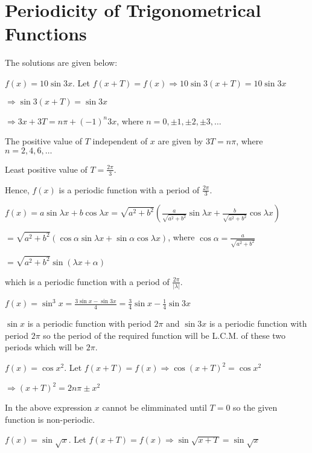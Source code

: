 \chapter{Periodicity of Trigonometrical Functions}
\startitemize[n, 1*broad]
\item The solutions are given below:
  \startitemize[i]
   \item $f(x) = 10\sin3x$. Let $f(x + T) = f(x) \Rightarrow 10\sin3(x + T) = 10\sin3x$

     $\Rightarrow \sin3(x + T) = \sin3x$

     $\Rightarrow 3x + 3T = n\pi + (-1)^n3x$, where $n = 0, \pm1, \pm2, \pm3, \ldots$

     The positive value of $T$ independent of $x$ are given by $3T = n\pi$, where
     $n = 2, 4, 6, \ldots$

     Least positive value of $T = \frac{2\pi}{3}$.

     Hence, $f(x)$ is a periodic function with a period of $\frac{2\pi}{3}$.

   \item $f(x) = a\sin\lambda x + b\cos\lambda x = \sqrt{a^2 + b^2}\left(\frac{a}{\sqrt{a^2 +
           b^2}}\sin\lambda x + \frac{b}{\sqrt{a^2 + b^2}}\cos\lambda x\right)$

     $= \sqrt{a^2+b^2}(\cos\alpha\sin\lambda x + \sin\alpha\cos\lambda x)$, where $\cos\alpha
     = \frac{a}{\sqrt{a^2 + b^2}}$

     $= \sqrt{a^2 + b^2}\sin(\lambda x + \alpha)$

     which is a periodic function with a period of $\frac{2\pi}{|\lambda|}$.

   \item $f(x) = \sin^3x = \frac{3\sin x - \sin3x}{4} = \frac{3}{4}\sin x - \frac{1}{4}\sin3x$

     $\sin x$ is a periodic function with period $2\pi$ and $\sin3x$ is a periodic
     function with period $2\pi$ so the period of the required function will be L.C.M. of these two
     periods which will be $2\pi$.

   \item $f(x) = \cos x^2$. Let $f(x + T) = f(x) \Rightarrow \cos(x + T)^2 = \cos x^2$

     $\Rightarrow (x + T)^2 = 2n\pi \pm x^2$

     In the above expression $x$ cannot be elimminated until $T = 0$ so the given function is
     non-periodic.

   \item $f(x) = \sin\sqrt{x}$. Let $f(x + T) = f(x) \Rightarrow \sin\sqrt{x + T} = \sin\sqrt{x}$


